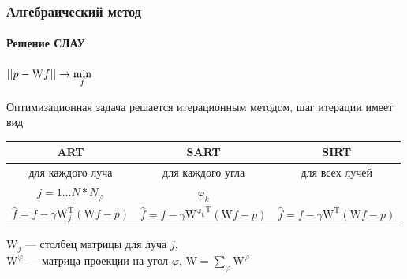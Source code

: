 \documentclass[12pt]{beamer}
\begin{document}
\begin{frame}
\frametitle{Алгебраический метод}
\framesubtitle{Решение СЛАУ}
\centering
$\left|\left| p - \mathrm W f \right|\right| \rightarrow \min\limits_f$

Оптимизационная задача решается итерационным методом, шаг итерации имеет вид
\vspace{0.5cm}

\begingroup
\footnotesize

\hspace*{-0.5cm}
\begin{tabular}{c|c|c}
ART & SART & SIRT \\ \hline
для каждого луча & для каждого угла & для всех лучей\\
$j = 1 \dots N * N_\varphi$ & $\varphi_k$ & \\
$\hat{f} = f - \gamma \mathrm W^{\mathrm T}_j(\mathrm W f - p)$ &
$\hat{f} = f - \gamma \mathrm {W^{\varphi_k}}^{\mathrm T}(\mathrm W f - p)$ &
$\hat{f} = f - \gamma \mathrm W^{\mathrm T}(\mathrm W f - p)$ \\
\end{tabular}

\vspace{0.5cm}
\raggedright
\endgroup

$\mathrm W_j$ --- столбец матрицы для луча $j$,\\
$\mathrm W^\varphi$ ---  матрица проекции на угол $\varphi$, $\mathrm W = \sum_\varphi {\mathrm W^\varphi}$


\end{frame}

\end{document}
